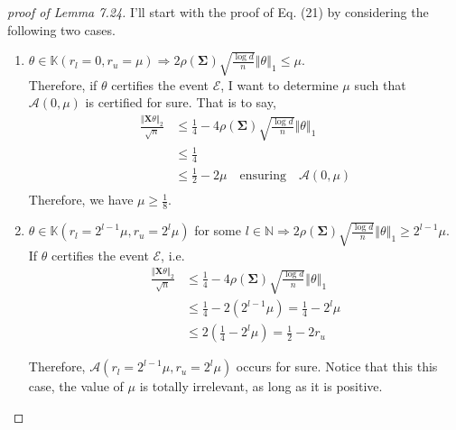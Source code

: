 \documentclass[a4paper, 11pt]{article}
\begin{document}
\begin{proof}[proof of Lemma 7.24]
I'll start with the proof of Eq. (21) by considering the following two cases. 
\begin{enumerate}
\item $\theta\in\mathbb{K}(r_l = 0, r_u=\mu) \Longrightarrow 2\rho(\mathbf{\Sigma})\sqrt{\frac{\log d}{n}}\left\Vert\theta \right\Vert_1 \leq \mu$.\\

Therefore, if $\theta$ certifies the event $\mathcal{E}$, I want to determine $\mu$ such that $\mathcal{A}(0, \mu)$ is certified for sure. That is to say, 
\begin{equation}
\begin{split}
\frac{\left\Vert\mathbf{X}\theta \right\Vert_2}{\sqrt{n}} & \leq \frac{1}{4} - 4\rho(\mathbf{\Sigma})\sqrt{\frac{\log d}{n}}\left\Vert\theta \right\Vert_1\\
 & \leq \frac{1}{4} \\
 & \leq \frac{1}{2} - 2\mu \quad \text{ensuring} \quad \mathcal{A}(0, \mu)\\
\end{split}
\end{equation}
Therefore, we have $\mu \geq \frac{1}{8}$.

\item $\theta\in\mathbb{K}(r_l = 2^{l-1}\mu, r_u=2^l\mu)$ for some $l\in\mathbb{N}\Longrightarrow 2\rho(\mathbf{\Sigma})\sqrt{\frac{\log d}{n}}\left\Vert\theta \right\Vert_1 \geq 2^{l-1}\mu$.\\

If $\theta$ certifies the event $\mathcal{E}$, i.e.
\begin{equation}
\begin{split}
\frac{\left\Vert\mathbf{X}\theta \right\Vert_2}{\sqrt{n}} & \leq \frac{1}{4} - 4\rho(\mathbf{\Sigma})\sqrt{\frac{\log d}{n}}\left\Vert\theta \right\Vert_1\\
 & \leq \frac{1}{4} - 2\left(2^{l-1}\mu\right) = \frac{1}{4} - 2^l\mu \\
 & \leq 2\left(\frac{1}{4} - 2^l\mu \right) = \frac{1}{2} - 2r_u
\end{split}
\end{equation}

Therefore, $\mathcal{A}(r_l = 2^{l-1}\mu, r_u=2^l\mu)$ occurs for sure. Notice that this this case, the value of $\mu$ is totally irrelevant, as long as it is positive. 
\end{enumerate}


\end{proof}
\end{document}
